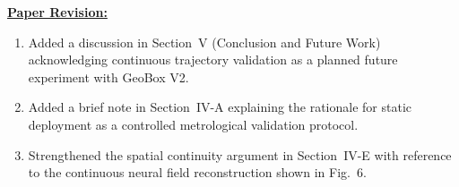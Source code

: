 \vspace{0.1cm}
\noindent
\underline{\textbf{Paper Revision:}}

\begin{enumerate}
    \item Added a discussion in Section~V (Conclusion and Future Work) acknowledging continuous trajectory validation as a planned future experiment with GeoBox V2.
    \item Added a brief note in Section~IV-A explaining the rationale for static deployment as a controlled metrological validation protocol.
    \item Strengthened the spatial continuity argument in Section~IV-E with reference to the continuous neural field reconstruction shown in Fig.~6.
\end{enumerate}
